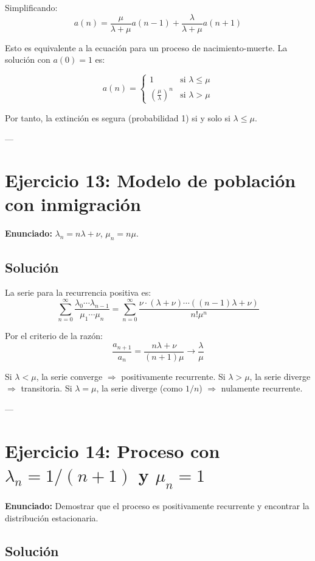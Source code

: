 \documentclass{article}
\theoremstyle{definition}
\begin{document}
Simplificando:
\[
a(n) = \frac{\mu}{\lambda+\mu} a(n-1) + \frac{\lambda}{\lambda+\mu} a(n+1)
\]

Esto es equivalente a la ecuación para un proceso de nacimiento-muerte. La solución con $a(0)=1$ es:

\[
a(n) = \begin{cases}
    1 & \text{si } \lambda \leq \mu \\
    \left(\frac{\mu}{\lambda}\right)^n & \text{si } \lambda > \mu
\end{cases}
\]

Por tanto, la extinción es segura (probabilidad 1) si y solo si $\lambda \leq \mu$.

---

\section*{Ejercicio 13: Modelo de población con inmigración}

\textbf{Enunciado:} $\lambda_n = n\lambda + \nu$, $\mu_n = n\mu$.

\subsection*{Solución}

La serie para la recurrencia positiva es:
\[
\sum_{n=0}^\infty \frac{\lambda_0 \cdots \lambda_{n-1}}{\mu_1 \cdots \mu_n} = \sum_{n=0}^\infty \frac{\nu \cdot (\lambda + \nu) \cdots ((n-1)\lambda + \nu)}{n! \mu^n}
\]

Por el criterio de la razón:
\[
\frac{a_{n+1}}{a_n} = \frac{n\lambda + \nu}{(n+1)\mu} \to \frac{\lambda}{\mu}
\]

Si $\lambda < \mu$, la serie converge $\Rightarrow$ positivamente recurrente.  
Si $\lambda > \mu$, la serie diverge $\Rightarrow$ transitoria.  
Si $\lambda = \mu$, la serie diverge (como $1/n$) $\Rightarrow$ nulamente recurrente.

---

\section*{Ejercicio 14: Proceso con $\lambda_n = 1/(n+1)$ y $\mu_n = 1$}

\textbf{Enunciado:} Demostrar que el proceso es positivamente recurrente y encontrar la distribución estacionaria.

\subsection*{Solución}
\end{document}

